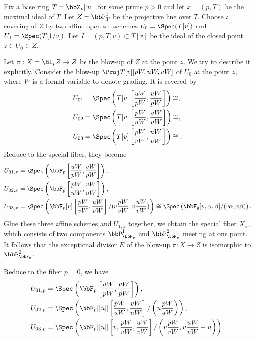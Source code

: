     Fix a base ring \(T = \bbZ_p[[u]]\) for some prime \(p>0\) and let \(x = (p,T)\) be the maximal ideal of \(T\).
    Let \(Z = \bbP^1_T\) be the projective line over \(T\).
    Choose a covering of \(Z\) by two affine open subschemes \(U_0 = \Spec(T[v])\) and \(U_1 = \Spec(T[1/v])\).
    Let \(I = (p,T,v) \subset T[v]\) be the ideal of the closed point \(z \in U_0 \subset Z\).

    Let \(\pi: X = \Bl_{p} Z \to Z\) be the blow-up of \(Z\) at the point \(z\).
    We try to describe it explicitly.
    Consider the blow-up \(\Proj T[v][pW,uW,vW]\) of \(U_0\) at the point \(z\), 
    where \(W\) is a formal variable to denote grading.
    It is covered by 
    \begin{align*}
        U_{01} &= \Spec\left(T[v]\left[\frac{uW}{pW},\frac{vW}{pW}\right]\right) \cong , \\
        U_{02} &= \Spec\left(T[v]\left[\frac{pW}{uW},\frac{vW}{uW}\right]\right) \cong , \\
        U_{03} &= \Spec\left(T[v]\left[\frac{pW}{vW},\frac{uW}{vW}\right]\right) \cong . 
    \end{align*}
    Reduce to the special fiber, they become
    \begin{align*}
        U_{01,x} &= \Spec\left(\bbF_p\left[\frac{uW}{pW},\frac{vW}{pW}\right]\right), \\
        U_{02,x} &= \Spec\left(\bbF_p\left[\frac{pW}{uW},\frac{vW}{uW}\right]\right), \\
        U_{03,x} &= \Spec\left(\bbF_p[v]\left[\frac{pW}{vW},\frac{uW}{vW}\right]/(v\frac{pW}{vW},v\frac{uW}{vW})\right) \cong \Spec\left(\bbF_p[v,\alpha,\beta]/(v\alpha,v\beta)\right). 
    \end{align*}
    Glue these three affine schemes and \(U_{1,x}\) together, we obtain the special fiber \(X_{x}\), which consists of two components \(\bbP_{\bbF_p}^1\) and \(\bbP_{\bbF_p}^2\) meeting at one point.
    It follows that the exceptional divisor \(E\) of the blow-up \(\pi: X \to Z\) is isomorphic to \(\bbP_{\bbF_p}^2\).

    Reduce to the fiber \(p=0\), we have 
    \begin{align*}
        U_{01,p} &= \Spec\left(\bbF_p\left[\frac{uW}{pW},\frac{vW}{pW}\right]\right), \\
        U_{02,p} &= \Spec\left(\bbF_p[[u]]\left[\frac{pW}{uW},\frac{vW}{uW}\right]/\left(u\frac{pW}{uW}\right)\right), \\
        U_{03,p} &= \Spec\left(\bbF_p[[u]]\left[v, \frac{pW}{vW},\frac{uW}{vW}\right]/\left(v\frac{pW}{vW},v\frac{uW}{vW}-u\right)\right).
    \end{align*}

